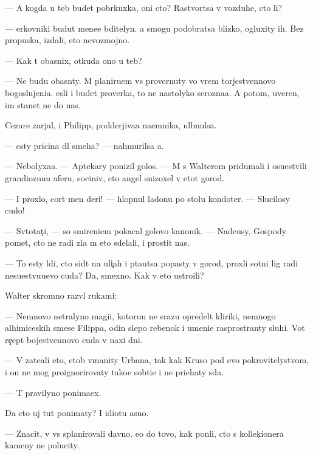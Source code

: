 \documentclass[10pt]{book}
\begin{document}
— A kogda u teb{\ia} budet pobr{\ia}kuxka, oni cto? Rastvor{\ia}tsa v vozduhe, cto li?

— {\C}erkovniki budut mene{\y}e bditelyn{\yi}. {\Y}a smogu podobratsa blizko, ogluxity ih. Bez propuska, izdali, eto nevozmojno.

— Kak t{\yi} ob{\y}asnix, otkuda ono u teb{\ia}?

— Ne budu ob{\y}asn{\ia}ty. M{\yi} planiru{\y}em vs{\e} provernuty vo vrem{\ia} torjestvennovo bogoslujeni{\y}a. {\Y}esli i budet proverka, to ne nastolyko ser{\y}ozna{\y}a. A potom, uveren, im stanet ne do nas.

Cezare zarjal, i Philipp, podderjiva{\y}a na{\y}emnika, ul{\yi}bnulsa.

— {\Y}esty pricina dl{\ia} smeha? — nahmurilsa {\y}a.

— Nebolyxa{\y}a. — Aptekary ponizil golos. — M{\yi} s Walterom pridumali i osu{\x}estvili grandioznu{\y}u aferu, sociniv, cto angel snizoxel v etot gorod.

— I proxlo, cort men{\ia} deri! — hlopnul ladon{\y}u po stolu kondot{\y}er. — Slucilosy cudo!

— Sv{\ia}totat{\c}i, — so smireni{\y}em pokacal golovo{\y} kanonik. — Nade{\y}usy, Gospody po{\y}met, cto ne radi zla m{\yi} eto sdelali, i prostit nas.

— To {\y}esty l{\iu}di, cto sid{\ia}t na uli{\c}ah i p{\yi}ta{\y}utsa popasty v gorod, proxli sotni lig radi nesu{\x}estvu{\y}u{\x}evo cuda? Da, smexno. Kak v{\yi} eto ustro{\y}ili?

Walter skromno razv{\e}l rukami:

— Nemnovo ne{\y}tralyno{\y} magi{\y}i, kotoru{\y}u ne srazu opredel{\ia}t kliriki, nemnogo alhimiceskih smese{\y} Filippa, odin slepo{\y} rebenok i umeni{\y}e rasprostran{\ia}ty sluhi. Vot re{\c}ept bojestvennovo cuda v naxi dni.

— V{\yi} zate{\y}ali eto, ctob{\yi} v{\yi}manity Urbana, tak kak Kruso pod {\y}evo pokrovitelystvom, i on ne mog proignorirovaty tako{\y}e sob{\yi}ti{\y}e i ne pri{\y}ehaty s{\iu}da.

— T{\yi} pravilyno ponima{\y}ex.

Da cto uj tut ponimaty? I idiotu {\y}asno.

— Znacit, v{\yi} vs{\e} splanirovali davno. {\y}e{\x}o do tovo, kak pon{\ia}li, cto s kollek{\c}ionera kameny ne polucity.
\end{document}
